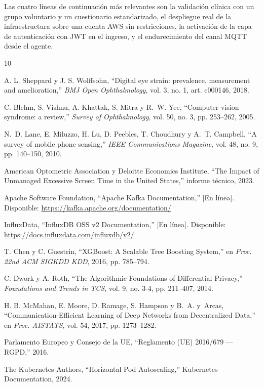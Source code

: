 \documentclass[conference]{IEEEtran}
\begin{document}
Las cuatro líneas de continuación más relevantes son la 
validación clínica con un grupo voluntario y un cuestionario 
estandarizado, el despliegue real de la infraestructura sobre 
una cuenta AWS sin restricciones, la activación de la capa de 
autenticación con JWT en el ingreso, y el endurecimiento del 
canal MQTT desde el agente.
\newpage
\begin{thebibliography}{10}

A. L. Sheppard y J. S. Wolffsohn,
``Digital eye strain: prevalence, measurement and amelioration,''
\emph{BMJ Open Ophthalmology}, vol. 3, no. 1, art. e000146, 2018.

C. Blehm, S. Vishnu, A. Khattak, S. Mitra y R.~W. Yee,
``Computer vision syndrome: a review,''
\emph{Survey of Ophthalmology}, vol. 50, no. 3, pp. 253--262, 2005.

N.~D. Lane, E. Miluzzo, H. Lu, D. Peebles, T. Choudhury y A.~T. Campbell,
``A survey of mobile phone sensing,''
\emph{IEEE Communications Magazine}, vol. 48, no. 9, pp. 140--150, 2010.

American Optometric Association y Deloitte Economics Institute,
``The Impact of Unmanaged Excessive Screen Time in the United States,''
informe técnico, 2023.

Apache Software Foundation,
``Apache Kafka Documentation,'' [En línea]. Disponible:
\url{https://kafka.apache.org/documentation/}

InfluxData,
``InfluxDB OSS v2 Documentation,''
[En línea]. Disponible:
\url{https://docs.influxdata.com/influxdb/v2/}

T. Chen y C. Guestrin,
``XGBoost: A Scalable Tree Boosting System,''
en \emph{Proc. 22nd ACM SIGKDD KDD}, 2016, pp. 785--794.

C. Dwork y A. Roth,
``The Algorithmic Foundations of Differential Privacy,''
\emph{Foundations and Trends in TCS}, vol. 9, no. 3-4,
pp. 211--407, 2014.

H. B. McMahan, E. Moore, D. Ramage, S. Hampson y B.~A. y~Arcas,
``Communication-Efficient Learning of Deep Networks from
Decentralized Data,'' en \emph{Proc. AISTATS}, vol. 54, 2017,
pp. 1273--1282.

Parlamento Europeo y Consejo de la UE,
``Reglamento (UE) 2016/679 — RGPD,'' 2016.

The Kubernetes Authors,
``Horizontal Pod Autoscaling,'' Kubernetes Documentation, 2024.

\end{thebibliography}
\end{document}

